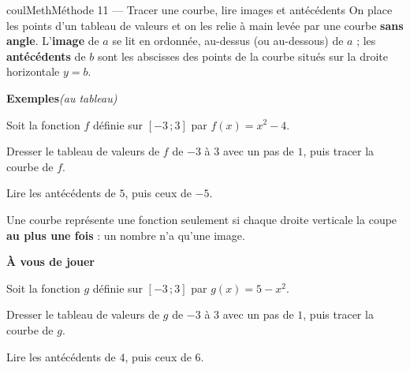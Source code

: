 \documentclass[11pt,a4paper]{article}
\makeatletter
\newcommand{\lycee@intff}[2]{\left[#1\,;#2\right]}
\providecommand{\intff}{\lycee@intff}%
\newcounter{lycee@signet}
\newcommand{\signet}[3][]{\stepcounter{lycee@signet}%
  \edef\lycee@dest{\if\relax\detokenize{#1}\relax
    signet.\arabic{lycee@signet}\else#1\fi}%
  \hypertarget{\lycee@dest}{}\bookmark[level=#2,dest=\lycee@dest]{#3}}
\newcounter{methode}
\newenvironment{methodebox}[1][Méthode]{\stepcounter{methode}%
  \begin{boitecours}[phantom={\signet[methode-\arabic{methode}]{2}{#1}}]{coulMeth}{#1}}%
  {\end{boitecours}}
\newcommand{\etape}[1]{\par\smallskip\textbf{\color{coulMeth}#1}\par\nobreak\smallskip}
\newcommand{\autableau}{\hfill{\footnotesize\itshape\color{black!45}(au tableau)}}
\newcommand{\etapeexemples}{%
    \par\smallskip\textbf{\color{coulMeth}Exemples}\autableau\par\nobreak\smallskip}
\makeatother
\begin{document}
\begin{methodebox}[Méthode 11 --- Tracer une courbe, lire images et antécédents]
On place les points d'un tableau de valeurs et on les relie à main levée par une courbe
\textbf{sans angle}. L'\textbf{image} de $a$ se lit en ordonnée, au-dessus (ou
au-dessous) de $a$ ; les \textbf{antécédents} de $b$ sont les abscisses des points de la
courbe situés sur la droite horizontale $y=b$.
\etapeexemples
Soit la fonction $f$ définie sur $\intff{-3}{3}$ par ${f(x)=x^{2}-4}$.
\begin{questions}[label=\alph*)]
  \item Dresser le tableau de valeurs de $f$ de $-3$ à $3$ avec un pas de $1$, puis
        tracer la courbe de $f$.
  \item Lire les antécédents de $5$, puis ceux de $-5$.
\end{questions}

\begin{remarquebox}
Une courbe représente une fonction seulement si chaque droite verticale la coupe
\textbf{au plus une fois} : un nombre n'a qu'une image.
\end{remarquebox}

\etape{À vous de jouer}
Soit la fonction $g$ définie sur $\intff{-3}{3}$ par ${g(x)=5-x^{2}}$.
\begin{questions}[label=\alph*)]
  \item Dresser le tableau de valeurs de $g$ de $-3$ à $3$ avec un pas de $1$, puis
        tracer la courbe de $g$.
  \item Lire les antécédents de $4$, puis ceux de $6$.
\end{questions}

\end{methodebox}
\end{document}
